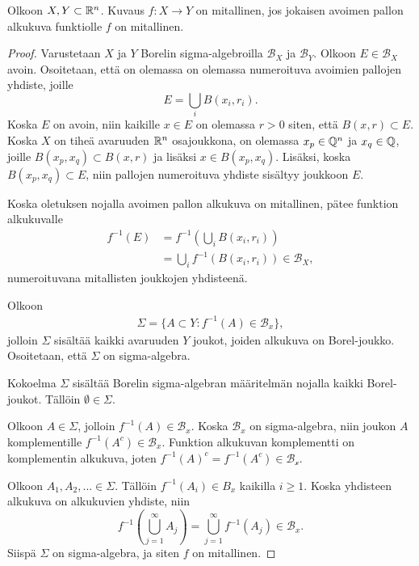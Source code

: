 \documentclass[12pt,oneside,a4paper]{amsbook} %
\begin{document}
\begin{lemma}\label{le:measurableIfBallMeasurable}
    Olkoon $X, Y \subset \mathbb{R}^n$. Kuvaus $f: X \to Y$ on mitallinen, jos jokaisen avoimen pallon alkukuva funktiolle $f$ on mitallinen.
\end{lemma}
\begin{proof}
    Varustetaan $X$ ja $Y$ Borelin sigma-algebroilla $\mathcal B_X$ ja $\mathcal B_Y$.  Olkoon $E\in\mathcal B_X$ avoin. Osoitetaan, että on olemassa on olemassa numeroituva avoimien pallojen yhdiste, joille
    \begin{equation*}
        E = \bigcup_i B(x_i, r_i).
    \end{equation*}
    Koska $E$ on avoin, niin kaikille $x \in E$ on olemassa $r > 0$ siten, että $B(x, r) \subset E$. Koska $X$ on tiheä avaruuden $\mathbb{R}^n$ osajoukkona, on olemassa $x_p \in \mathbb{Q}^n$ ja $x_q \in \mathbb{Q}$, joille $B(x_p, x_q) \subset B(x, r)$ ja lisäksi $x \in B(x_p, x_q)$. Lisäksi, koska $B(x_p, x_q) \subset E$, niin pallojen numeroituva yhdiste sisältyy joukkoon $E$.
    
    Koska oletuksen nojalla avoimen pallon alkukuva on mitallinen, pätee funktion alkukuvalle
    \begin{align*}
        f^{-1}(E) &= f^{-1}\left(\bigcup_i B(x_i, r_i)\right) \\
        &= \bigcup_i f^{-1}(B(x_i, r_i)) \in \mathcal B_X,
    \end{align*}
    numeroituvana mitallisten joukkojen yhdisteenä. 
    
    Olkoon 
    \begin{align*}
        \Sigma =\{A \subset Y : f^{-1}(A) \in \mathcal B_x\},
    \end{align*}
    jolloin $\Sigma$ sisältää kaikki avaruuden $Y$ joukot, joiden alkukuva on Borel-joukko. Osoitetaan, että $\Sigma$ on sigma-algebra. 
    
    Kokoelma $\Sigma$ sisältää Borelin sigma-algebran määritelmän nojalla kaikki Borel-joukot. Tällöin $\emptyset \in \Sigma$. 
    
    Olkoon $A \in \Sigma$, jolloin $f^{-1}(A) \in \mathcal B_x$. Koska $\mathcal B_x$ on sigma-algebra, niin joukon $A$ komplementille $f^{-1}(A^c) \in \mathcal B_x$. Funktion alkukuvan komplementti on komplementin alkukuva, joten $f^{-1}(A)^c = f^{-1}(A^c) \in \mathcal{B_x}$.
    
    Olkoon $A_1, A_2, ... \in \Sigma$. Tällöin $f^{-1}(A_i) \in B_x$ kaikilla $i \ge 1$. Koska yhdisteen alkukuva on alkukuvien yhdiste, niin
    \begin{equation*}
        f^{-1}\left(\bigcup_{j=1}^\infty A_j\right) = \bigcup_{j=1}^\infty f^{-1}(A_j) \in \mathcal{B}_x.
    \end{equation*}
    Siispä $\Sigma$ on sigma-algebra, ja siten $f$ on mitallinen.
\end{proof}
\end{document}
